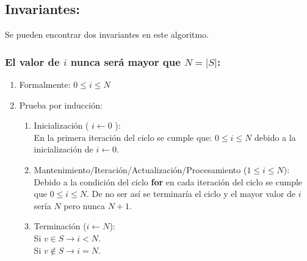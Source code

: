 \documentclass[12pt,spanish]{article}
\theoremstyle{definition}
\begin{document}
\subsection{Invariantes:}{}
Se pueden encontrar dos invariantes en este algoritmo.
\subsubsection{El valor de $i$ nunca será mayor que $N = |S|$:}{}

\begin{enumerate}
\item Formalmente: $ 0  \le i  \le N $
\item Prueba por inducción:
    \begin{enumerate}
    \item Inicialización ( $i \leftarrow 0 $ ):\\
        En la primera iteración del ciclo se cumple que: $ 0  \le i  \le N $ debido a la inicialización de $i \leftarrow 0$. 
    \item Mantenimiento/Iteración/Actualización/Procesamiento  ($ 1  \le i  \le N $):\\
        Debido a la condición del ciclo \textbf{for} en cada iteración del ciclo se cumple que $ 0  \le i  \le N $. De no ser así se terminaría el ciclo y el mayor valor de $i$ sería $N$ pero nunca $N + 1 $.
    \item Terminación ($ i \leftarrow N $): \\
        Si $v \in S \rightarrow i < N $. \\
        Si $v \notin S \rightarrow i = N$.
    \end{enumerate}
\end{enumerate}
\end{document}
